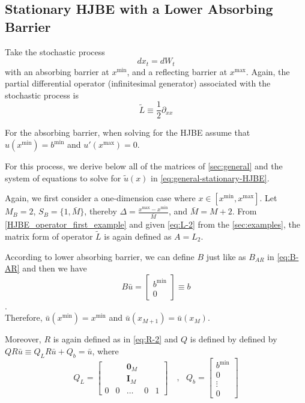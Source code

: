 \documentclass[11pt]{article}
\newcommand{\D}[1][]{\ensuremath{\partial_{#1}}}
\begin{document}
\subsection{Stationary HJBE with a Lower Absorbing Barrier}
Take the stochastic process
$$
d x_t = d W_t
$$
with an absorbing barrier at $x^{\min}$, and a reflecting barrier at $x^{\max}$. Again, the partial differential operator (infinitesimal generator) associated with the stochastic process is
$$
\tilde{L} \equiv \frac{1}{2}\D[xx]
$$

For the absorbing barrier, when solving for the HJBE assume that $u(x^{\min}) = b^{\min}$ and $u'(x^{\max}) = 0$.

For this process, we derive below all of the matrices of \cref{sec:general} and the system of equations to solve for $\tilde{u}(x)$ in \cref{eq:general-stationary-HJBE}.

Again, we first consider a one-dimension case where $x\in [x^{\min},x^{\max}]$. Let $M_B = 2$, $S_B = \{1,\bar{M}\}$, thereby $\Delta  = \frac{x^{\max}-x^{\min}}{\bar{M}}$, and $\bar{M} = M+2$. From \eqref{HJBE_operator_first_example} and given \eqref{eq:L-2} from the \cref{sec:examples}, the matrix form of operator $\tilde{L}$ is again defined as $A = L_2$.

According to lower absorbing barrier, we can define $B$ just like as $B_{AR}$ in \eqref{eq:B-AR} and then we have
\begin{equation}
B\bar{u} = \begin{bmatrix}
b^{\min}\\
0
\end{bmatrix} \equiv b
\end{equation}.\\
Therefore, $\bar{u}(x^{\min}) = x^{\min}$ and $\bar{u}(x_{M+1}) = \bar{u}(x_M)$.

Moreover, $R$ is again defined as in \eqref{eq:R-2} and $Q$ is defined by defined by $Q R\bar{u}\equiv Q_L R\bar{u}+Q_b = \bar{u}$, where
\begin{equation}
Q_L = \begin{bmatrix}
& & \mathbf{0}_M & & \\
& & \mathbf{I}_M & & \\
0&0&\dots&0&1
\end{bmatrix}%
\quad, \text{ } Q_b = \begin{bmatrix}
b^{\min}\\
0\\
\vdots\\
0
\end{bmatrix}%
\end{equation}
\end{document}
